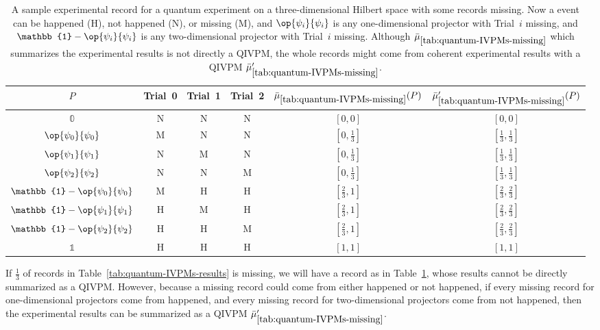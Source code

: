 \documentclass[english,reprint, aps, prl,superscriptaddress, showpacs,
showkeys, longbibliography, amsmath, amssymb, floatfix]{revtex4-1}
\theoremstyle{plain}
\theoremstyle{definition}
\newcommand{\imposs}{\ensuremath{\left[0,0\right]}}
\newcommand{\necess}{\ensuremath{\left[1,1\right]}}
\newcommand{\proj}[1]{\op{#1}{#1}}
\newcommand{\happen}{\text{H}}
\newcommand{\notHappen}{\text{N}}
\newcommand{\missing}{\text{M}}
\begin{document}
\begin{table}
\noindent \centering{}\caption{\label{tab:quantum-IVPMs-missing}A sample experimental record for
a quantum experiment on a three-dimensional Hilbert space with some
records missing. Now a event can be happened ($\happen$), not happened
($\notHappen$), or missing ($\missing$), and $\proj{\psi_{i}}$
is any one-dimensional projector with Trial~$i$ missing, and $\mathbb{1}-\proj{\psi_{i}}$
is any two-dimensional projector with Trial~$i$ missing. Although
$\bar{\mu}_{\ref{tab:quantum-IVPMs-missing}}$ which summarizes the
experimental results is not directly a QIVPM, the whole records might
come from coherent experimental results with a QIVPM $\bar{\mu}_{\ref{tab:quantum-IVPMs-missing}}'$.}
\begin{tabular}{cccccc}
\toprule 
\addlinespace
$P$  & Trial~0 & Trial~1 & Trial~2 & $\bar{\mu}_{\ref{tab:quantum-IVPMs-missing}}(P)$ & $\bar{\mu}_{\ref{tab:quantum-IVPMs-missing}}'(P)$\tabularnewline
\midrule
\midrule 
\addlinespace
$\mathbb{0}$  & $\notHappen$ & $\notHappen$ & $\notHappen$ & $\imposs$ & $\imposs$\tabularnewline
\midrule 
\addlinespace
$\proj{\psi_{0}}$  & $\missing$ & $\notHappen$ & $\notHappen$ & $\left[0,\frac{1}{3}\right]$ & $\left[\frac{1}{3},\frac{1}{3}\right]$\tabularnewline
\midrule 
\addlinespace
$\proj{\psi_{1}}$  & $\notHappen$ & $\missing$ & $\notHappen$ & $\left[0,\frac{1}{3}\right]$ & $\left[\frac{1}{3},\frac{1}{3}\right]$\tabularnewline
\midrule 
\addlinespace
$\proj{\psi_{2}}$  & $\notHappen$ & $\notHappen$ & $\missing$ & $\left[0,\frac{1}{3}\right]$ & $\left[\frac{1}{3},\frac{1}{3}\right]$\tabularnewline
\midrule 
\addlinespace
$\mathbb{1}-\proj{\psi_{0}}$  & $\missing$ & $\happen$ & $\happen$ & $\left[\frac{2}{3},1\right]$ & $\left[\frac{2}{3},\frac{2}{3}\right]$\tabularnewline
\midrule 
\addlinespace
$\mathbb{1}-\proj{\psi_{1}}$  & $\happen$ & $\missing$ & $\happen$ & $\left[\frac{2}{3},1\right]$ & $\left[\frac{2}{3},\frac{2}{3}\right]$\tabularnewline
\midrule 
\addlinespace
$\mathbb{1}-\proj{\psi_{2}}$  & $\happen$ & $\happen$ & $\missing$ & $\left[\frac{2}{3},1\right]$ & $\left[\frac{2}{3},\frac{2}{3}\right]$\tabularnewline
\midrule 
\addlinespace
$\mathbb{1}$  & $\happen$ & $\happen$ & $\happen$ & $\necess$ & $\necess$\tabularnewline
\bottomrule
\end{tabular}
\end{table}
If $\frac{1}{3}$ of records in Table~\ref{tab:quantum-IVPMs-results}
is missing, we will have a record as in Table~\ref{tab:quantum-IVPMs-missing},
whose results cannot be directly summarized as a QIVPM. However, because
a missing record could come from either happened or not happened,
if every missing record for one-dimensional projectors come from happened,
and every missing record for two-dimensional projectors come from
not happened, then the experimental results can be summarized as a
QIVPM $\bar{\mu}_{\ref{tab:quantum-IVPMs-missing}}'$.


\end{document}
